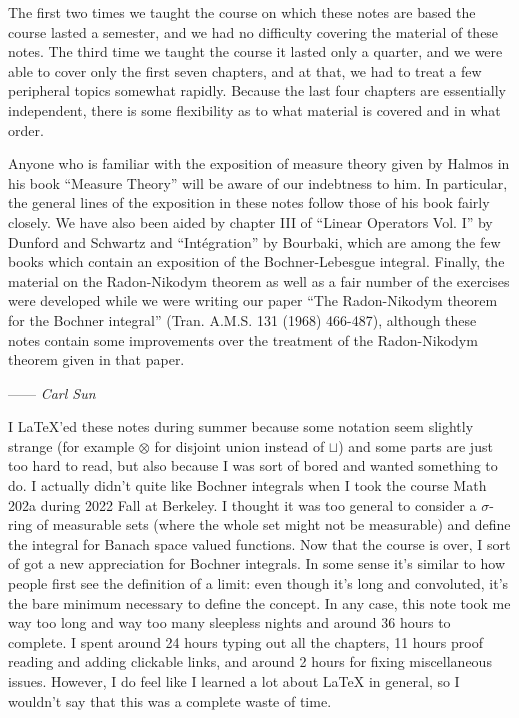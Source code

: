 The first two times we taught the course on which these notes are based the course lasted a semester, and we had no difficulty covering the material of these notes. The third time we taught the course it lasted only a quarter, and we were able to cover only the first seven chapters, and at that, we had to treat a few peripheral topics somewhat rapidly. Because the last four chapters are essentially independent, there is some flexibility as to what material is covered and in what order.

Anyone who is familiar with the exposition of measure theory given by Halmos in his book ``Measure Theory'' will be aware of our indebtness to him. In particular, the general lines of the exposition in these notes follow those of his book fairly closely. We have also been aided by chapter III of ``Linear Operators Vol. I'' by Dunford and Schwartz and ``Int\'{e}gration'' by Bourbaki, which are among the few books which contain an exposition of the Bochner-Lebesgue integral. Finally, the material on the Radon-Nikodym theorem as well as a fair number of the exercises were developed while we were writing our paper ``The Radon-Nikodym theorem for the Bochner integral'' (Tran. A.M.S. 131 (1968) 466-487), although these notes contain some improvements over the treatment of the Radon-Nikodym theorem given in that paper.



\hspace*{0pt}\hfill------ {\it Carl Sun}


I LaTeX'ed these notes during summer because some notation seem slightly strange (for example $\otimes$ for disjoint union instead of $\sqcup$) and some parts are just too hard to read, but also because I was sort of bored and wanted something to do. I actually didn't quite like Bochner integrals when I took the course Math 202a during 2022 Fall at Berkeley. I thought it was too general to consider a $\sigma$-ring of measurable sets (where the whole set might not be measurable) and define the integral for Banach space valued functions. Now that the course is over, I sort of got a new appreciation for Bochner integrals. In some sense it's similar to how people first see the definition of a limit: even though it's long and convoluted, it's the bare minimum necessary to define the concept. In any case, this note took me way too long and way too many sleepless nights and around 36 hours to complete. I spent around 24 hours typing out all the chapters, 11 hours proof reading and adding clickable links, and around 2 hours for fixing miscellaneous issues. However, I do feel like I learned a lot about LaTeX in general, so I wouldn't say that this was a complete waste of time. 